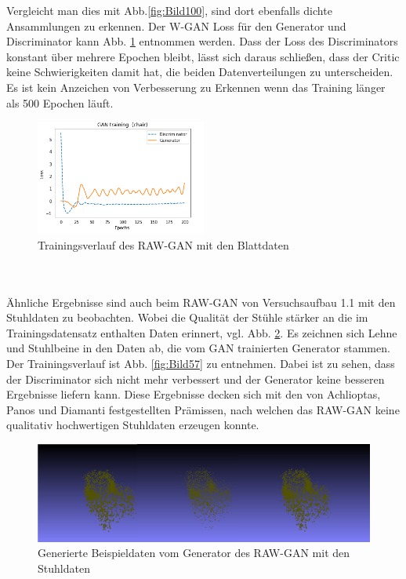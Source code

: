 \documentclass{llncs}
\begin{document}
Vergleicht man dies mit Abb.\ref{fig:Bild100}, sind dort ebenfalls dichte Ansammlungen zu erkennen. Der W-GAN Loss für den Generator und Discriminator kann Abb. \ref{fig:Bild1002} entnommen werden. Dass der Loss des Discriminators konstant über mehrere Epochen bleibt, lässt sich daraus schließen, dass der Critic keine Schwierigkeiten damit hat, die beiden Datenverteilungen zu unterscheiden. Es ist kein Anzeichen von Verbesserung zu Erkennen wenn das Training länger als 500 Epochen läuft. 
\begin{figure}[htbp]
	\centering
	\includegraphics[width=0.5\textwidth]{raw_gan_leaf_result.png}
	\caption{Trainingsverlauf des RAW-GAN mit den Blattdaten}
	\label{fig:Bild1002}
\end{figure}
~\\\\
Ähnliche Ergebnisse sind auch beim RAW-GAN von Versuchsaufbau 1.1 mit den Stuhldaten zu beobachten. Wobei die Qualität der Stühle stärker an die im Trainingsdatensatz enthalten Daten erinnert, vgl. Abb. \ref{fig:Bild58}. Es zeichnen sich Lehne und Stuhlbeine in den Daten ab, die vom GAN trainierten Generator stammen. Der Trainingsverlauf ist Abb. \ref{fig:Bild57} zu entnehmen. Dabei ist zu sehen, dass der Discriminator sich nicht mehr verbessert und der Generator keine besseren Ergebnisse liefern kann. Diese Ergebnisse decken sich mit den von Achlioptas, Panos und Diamanti \cite{3dgan} festgestellten Prämissen, nach welchen das RAW-GAN keine qualitativ hochwertigen Stuhldaten erzeugen konnte.  
\begin{figure}[htbp] 
	\centering
	\includegraphics[width=1.0\textwidth]{raw_gan_chair_example.png}
	\caption{Generierte Beispieldaten vom Generator des RAW-GAN mit den Stuhldaten}
	\label{fig:Bild58}
	\end{figure}
\end{document}
